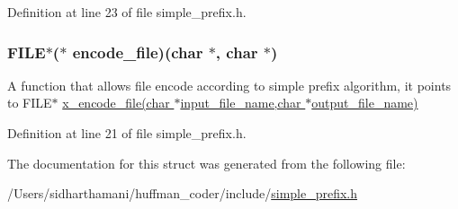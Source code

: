 Definition at line 23 of file simple\-\_\-prefix.\-h.

\hypertarget{structsimple__prefix_a73d0a239981b130553964b3839c20bdf}{
\subsubsection[{encode\-\_\-file}]{\setlength{\rightskip}{0pt plus 5cm}F\-I\-L\-E$\ast$($\ast$ encode\-\_\-file)(char $\ast$, char $\ast$)}}\label{structsimple__prefix_a73d0a239981b130553964b3839c20bdf}
A function that allows file encode according to simple prefix algorithm, it points to F\-I\-L\-E$\ast$ \hyperlink{simple__prefix_8c_aa71732b02f99cbdbee35eb443ec58501}{x\-\_\-encode\-\_\-file(char $\ast$input\-\_\-file\-\_\-name,char $\ast$output\-\_\-file\-\_\-name)} 

Definition at line 21 of file simple\-\_\-prefix.\-h.



The documentation for this struct was generated from the following file\-:\begin{DoxyCompactItemize}
\item 
/\-Users/sidharthamani/huffman\-\_\-coder/include/\hyperlink{simple__prefix_8h}{simple\-\_\-prefix.\-h}\end{DoxyCompactItemize}
